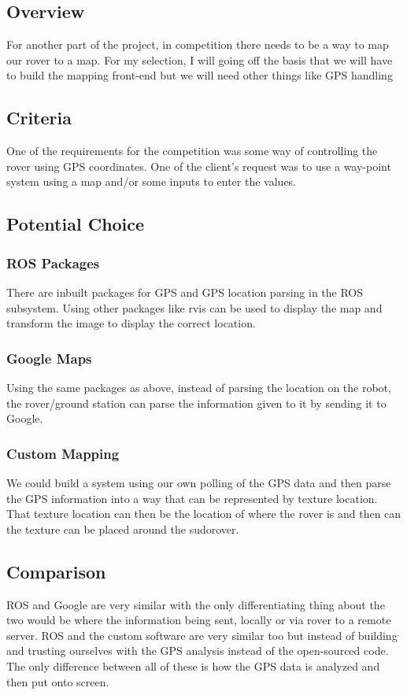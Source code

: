 \documentclass[onecolumn, draftclsnofoot, 10pt, compsoc]{IEEEtran}
\begin{document}
\subsection{Overview}
For another part of the project, in competition there needs to be a way to map our rover to a map.
For my selection, I will going off the basis that we will have to build the mapping front-end but we will need other things like GPS handling
\subsection{Criteria}
One of the requirements for the competition was some way of controlling the rover using GPS coordinates.
One of the client's request was to use a way-point system using a map and/or some inputs to enter the values.
\subsection{Potential Choice}
\subsubsection{ROS Packages}
There are inbuilt packages for GPS and GPS location parsing in the ROS subsystem.
Using other packages like rvis can be used to display the map and transform the image to display the correct location.
\subsubsection{Google Maps}
Using the same packages as above, instead of parsing the location on the robot, the rover/ground station can parse the information given to it by sending it to Google.
\subsubsection{Custom Mapping}
We could build a system using our own polling of the GPS data and then parse the GPS information into a way that can be represented by texture location.
That texture location can then be the location of where the rover is and then can the texture can be placed around the sudorover.
\subsection{Comparison}
ROS and Google are very similar with the only differentiating thing about the two would be where the information being sent, locally or via rover to a remote server.
ROS and the custom software are very similar too but instead of building and trusting ourselves with the GPS analysis instead of the open-sourced code.
The only difference between all of these is how the GPS data is analyzed and then put onto screen.
\end{document}
